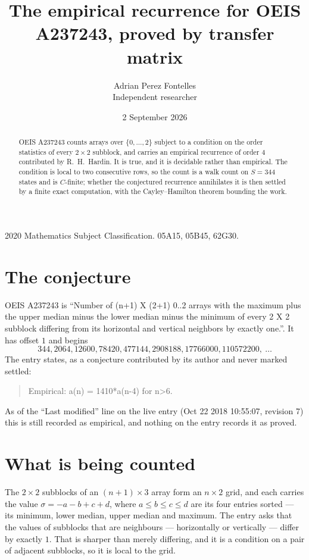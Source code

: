 \documentclass[11pt,a4paper]{article}
\title{The empirical recurrence for OEIS A237243, proved by transfer matrix}
\author{Adrian Perez Fontelles\\ \small Independent researcher}
\date{2 September 2026}
\theoremstyle{plain}
\theoremstyle{definition}
\begin{document}
\maketitle

\begin{abstract}
OEIS A237243 counts arrays over $\{0,\dots,2\}$ subject to a condition on the order
statistics of every $2\times2$ subblock, and carries an empirical recurrence of order
$4$ contributed by R.~H.~Hardin. It is true, and it is decidable rather than empirical.
The condition is local to two consecutive rows, so the count is a walk count on $S=344$
states and is $C$-finite; whether the conjectured recurrence annihilates it is then settled by
a finite exact computation, with the Cayley--Hamilton theorem bounding the work.
\end{abstract}

\noindent\small 2020 Mathematics Subject Classification. 05A15, 05B45, 62G30.\normalsize

\section{The conjecture}

OEIS A237243 is ``Number of (n+1) X (2+1) 0..2 arrays with the maximum plus the upper median minus the lower median minus the minimum of every 2 X 2 subblock differing from its horizontal and vertical neighbors by exactly one.''. It has offset $1$ and begins
\[
344, 2064, 12600, 78420, 477144, 2908188, 17766000, 110572200,\ \dots
\]
The entry states, as a conjecture contributed by its author and never marked settled:
\begin{quote}
Empirical: a(n) = 1410*a(n-4) for n>6.
\end{quote}
As of the ``Last modified'' line on the live entry (Oct 22 2018 10:55:07, revision 7) this is still
recorded as empirical, and nothing on the entry records it as proved.

\section{What is being counted}

The $2\times2$ subblocks of an $(n+1)\times3$ array form an
$n\times2$ grid, and each carries the value $\sigma=-a-b+c+d$, where $a\le b\le c\le d$ are its four entries sorted --- its minimum, lower median, upper median and maximum. The entry asks that the values of
subblocks that are neighbours --- horizontally or vertically --- differ by exactly $1$.
That is sharper than merely differing, and it is a condition on a pair of adjacent subblocks,
so it is local to the grid.
\end{document}
